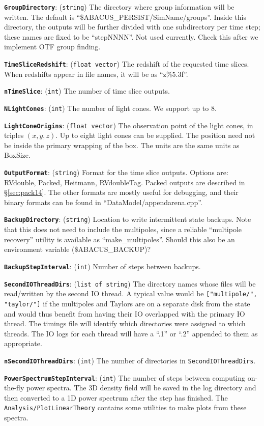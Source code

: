 \documentclass[11pt,preprint]{aastex}
\newcommand{\param}[2]{\medskip\noindent\textbf{\texttt{#1}}: ({\tt #2}) }
\newcommand{\todo}{}
\newcommand{\todo}[1]{{\bf TODO: #1}}
\begin{document}
\param{GroupDirectory}{string} The directory where group information
will be written.  The default is ``\$ABACUS\_PERSIST/SimName/groups''.  Inside this directory,
the outputs will be further divided with one subdirectory per time
step; these names are fixed to be ``stepNNNN''.
\todo{Not used currently.  Check this after we implement OTF group finding.}


\param{TimeSliceRedshift}{float vector} The redshift of the requested 
time slices.  When redshifts appear in file names, it will be as ``z\%5.3f''.

\param{nTimeSlice}{int} The number of time slice outputs.

\param{NLightCones}{int} The number of light cones.  We support up to 8.

\param{LightConeOrigins}{float vector} The observation point
of the light cones, in triples $(x,y,z)$.  Up to eight light cones 
can be supplied.  The position need not be inside the primary 
wrapping of the box.  The units are the same units as BoxSize.

\param{OutputFormat}{string} Format for the time slice outputs.
Options are: RVdouble, Packed, Heitmann, RVdoubleTag.  Packed outputs are described in \S\ref{sec:pack14}.  The other formats are mostly useful for debugging, and their binary formats can be found in ``DataModel/appendarena.cpp''.

\param{BackupDirectory}{string} Location to write intermittent state backups.  Note that this does not need to include the multipoles, since a reliable ``multipole recovery'' utility is available as ``make\_multipoles''.
\todo{Should this also be an environment variable (\$ABACUS\_BACKUP)?}

\param{BackupStepInterval}{int} Number of steps between backups.

\param{SecondIOThreadDirs}{list of string} The directory names whose files will be read/written by the second IO thread.  A typical value would be \verb|["multipole/", "taylor/"]| if the multipoles and Taylors are on a separate disk from the state and would thus benefit from having their IO overlapped with the primary IO thread.  The timings file will identify which directories were assigned to which threads.  The IO logs for each thread will have a ``.1'' or ``.2'' appended to them as appropriate.

\param{nSecondIOThreadDirs}{int} The number of directories in \verb|SecondIOThreadDirs|.

\param{PowerSpectrumStepInterval}{int} The number of steps between computing on-the-fly power spectra.  The 3D density field will be saved in the log directory and then converted to a 1D power spectrum after the step has finished.  The \verb|Analysis/PlotLinearTheory| contains some utilities to make plots from these spectra.
\end{document}
